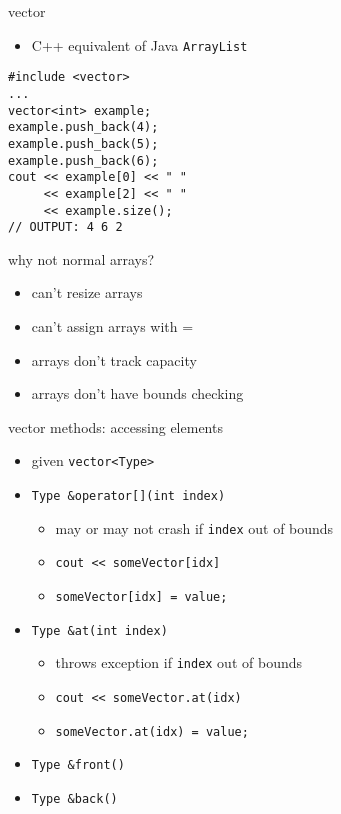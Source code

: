 \begin{frame}[fragile,label=vectorIntro]{vector}
\lstset{language=C++,style=small}
\begin{itemize}
\item C++ equivalent of Java \texttt{ArrayList}
\end{itemize}
\begin{lstlisting}
#include <vector>
...
vector<int> example;
example.push_back(4);
example.push_back(5);
example.push_back(6);
cout << example[0] << " "
     << example[2] << " "
     << example.size();
// OUTPUT: 4 6 2
\end{lstlisting}
\end{frame}

\begin{frame}{why not normal arrays?}
\begin{itemize}
\item can't resize arrays
\item can't assign arrays with =
\item arrays don't track capacity
\item arrays don't have bounds checking
\end{itemize}
\end{frame}

\begin{frame}[fragile,label=vectMeth]{vector methods: accessing elements}
\lstset{
    language=C++,
    style=small
}
\begin{itemize}
\item given \lstinline|vector<Type>|
\item \lstinline|Type &operator[](int index)|
    \begin{itemize}
    \item may or may not crash if \lstinline|index| out of bounds
    \item \lstinline|cout << someVector[idx]|
    \item \lstinline|someVector[idx] = value;|
    \end{itemize}
\item \lstinline|Type &at(int index)|
    \begin{itemize}
        \item throws exception if \lstinline|index| out of bounds
        \item \lstinline|cout << someVector.at(idx)|
        \item \lstinline|someVector.at(idx) = value;|
    \end{itemize}
\item \lstinline|Type &front()|
\item \lstinline|Type &back()|
\end{itemize}
\end{frame}

